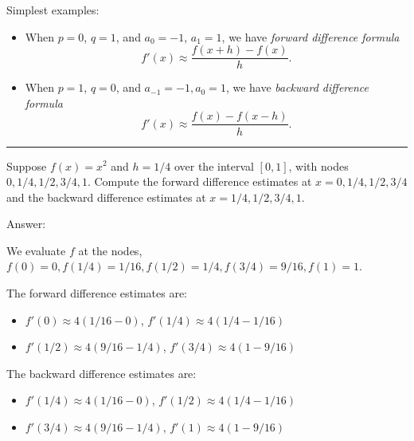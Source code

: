 \documentclass[
]{article}
\providecommand{\tightlist}{%
  \setlength{\itemsep}{0pt}\setlength{\parskip}{0pt}}\usepackage{longtable,booktabs,array}
\begin{document}
Simplest examples:

\begin{itemize}
\tightlist
\item
  When \(p = 0\), \(q = 1\), and \(a_0 = -1\), \(a_1 = 1\), we have
  \emph{forward difference formula}
  \[f'(x) \approx \frac{f(x+h) - f(x)}{h}.\]
\item
  When \(p = 1\), \(q = 0\), and \(a_{-1} = -1, a_0 = 1\), we have
  \emph{backward difference formula}
  \[f'(x) \approx \frac{f(x) - f(x-h)}{h}.\]
\end{itemize}

\begin{center}\rule{0.5\linewidth}{0.5pt}\end{center}

\begin{tcolorbox}[enhanced jigsaw, left=2mm, arc=.35mm, leftrule=.75mm, colbacktitle=quarto-callout-caution-color!10!white, coltitle=black, toptitle=1mm, bottomtitle=1mm, colback=white, colframe=quarto-callout-caution-color-frame, opacityback=0, breakable, titlerule=0mm, title={Exercise:}, rightrule=.15mm, bottomrule=.15mm, toprule=.15mm, opacitybacktitle=0.6]

Suppose \(f(x) = x^2\) and \(h = 1/4\) over the interval \([0,1]\), with
nodes \(0, 1/4, 1/2, 3/4, 1\). Compute the forward difference estimates
at \(x = 0, 1/4, 1/2, 3/4\) and the backward difference estimates at
\(x = 1/4, 1/2, 3/4, 1\).

\end{tcolorbox}

Answer:

We evaluate \(f\) at the nodes,
\(f(0) = 0, f(1/4) = 1/16, f(1/2) = 1/4, f(3/4) = 9/16, f(1) = 1\).

The forward difference estimates are:

\begin{itemize}
\tightlist
\item
  \(f'(0) \approx 4(1/16 - 0)\), \(f'(1/4) \approx 4(1/4 - 1/16)\)
\item
  \(f'(1/2) \approx 4(9/16 - 1/4)\), \(f'(3/4) \approx 4(1 - 9/16)\)
\end{itemize}

The backward difference estimates are:

\begin{itemize}
\tightlist
\item
  \(f'(1/4) \approx 4(1/16 - 0)\), \(f'(1/2) \approx 4(1/4 - 1/16)\)
\item
  \(f'(3/4) \approx 4(9/16 - 1/4)\), \(f'(1) \approx 4(1 - 9/16)\)
\end{itemize}
\end{document}
